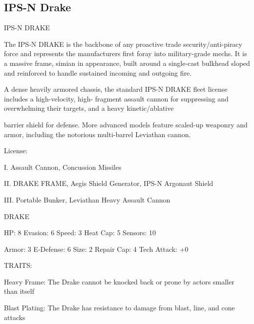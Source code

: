 \subsection{IPS-N Drake}

                                                                                                                                 
                                                    IPS-N DRAKE  

The IPS-N DRAKE is the backbone of any proactive trade security/anti-piracy force and represents the  
manufacturers first foray into military-grade mechs. It is a massive frame, simian in appearance, built  
around a single-cast bulkhead sloped and reinforced to handle sustained incoming and outgoing fire.    

A dense heavily armored chassis, the standard IPS-N DRAKE fleet license includes a high-velocity, high- 
fragment assault cannon for suppressing and overwhelming their targets, and a heavy kinetic/ablative  

barrier shield for defense. More advanced models feature scaled-up weaponry and armor, including the  
notorious multi-barrel Leviathan cannon.  

                                                                                                                           


                                                     License:
 
I. Assault Cannon, Concussion Missiles
 
II. DRAKE FRAME, Aegis Shield Generator, IPS-N Argonaut Shield
 
III. Portable Bunker, Leviathan Heavy Assault Cannon
 

                                                     DRAKE 

  HP: 8           Evasion: 6                             Speed: 3            Heat Cap: 5        Sensors: 10 

  Armor: 3        E-Defense: 6                           Size: 2             Repair Cap: 4      Tech Attack:  
                                                                                                +0 

                                                     TRAITS: 

  Heavy Frame: The Drake cannot be knocked back or prone by actors smaller than itself
 
  Blast Plating: The Drake has resistance to damage from blast, line, and cone attacks
 
